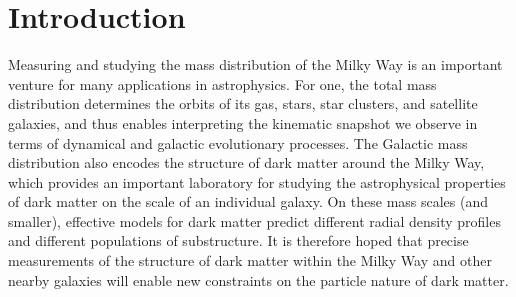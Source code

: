 \begin{abstract}

\end{abstract}


\section{Introduction} \label{sec:intro}

Measuring and studying the mass distribution of the Milky Way is an important venture
for many applications in astrophysics.
For one, the total mass distribution determines the orbits of its gas, stars, star
clusters, and satellite galaxies, and thus enables interpreting the kinematic snapshot
we observe in terms of dynamical and galactic evolutionary processes.
The Galactic mass distribution also encodes the structure of dark matter around the
Milky Way, which provides an important laboratory for studying the astrophysical
properties of dark matter on the scale of an individual galaxy.
On these mass scales (and smaller), effective models for dark matter predict different
radial density profiles and different populations of substructure.
It is therefore hoped that precise measurements of the structure of dark matter within
the Milky Way and other nearby galaxies will enable new constraints on the particle
nature of dark matter.

